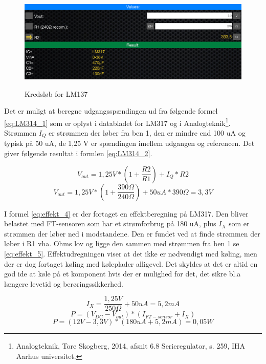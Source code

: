 \begin{figure}[H] \centering
{\includegraphics[width=\textwidth]{filer/design/Billeder/LM317_calc}}
\caption{Kredsløb for LM137}
\label{lab:LM317_calc}
\raggedright
\end{figure}

Det er muligt at beregne udgangsspændingen ud fra følgende formel \ref{eq:LM314_1} som er oplyst i databladet for LM317 og i Analogteknik\footnote{Analogteknik, Tore Skogberg, 2014, afsnit 6.8 Serieregulator, s. 259, IHA Aarhus universitet.}. Strømmen $I_Q$ er strømmen der løber fra ben 1, den er mindre end 100 uA og typisk på 50 uA, de 1,25 V er spændingen imellem udgangen og referencen. Det giver følgende resultat i formlen \ref{eq:LM314_2}. 

\begin{equation} 
V_{out} = 1,25 V*(1+\frac{R2}{R1})+I_Q*R2
\label{eq:LM314_1}
\end{equation}
\begin{equation} 
V_{out} = 1,25 V*(1+\frac{390\Omega}{240\Omega})+50uA*390\Omega = 3,3 V
\label{eq:LM314_2}
\end{equation}


I formel \ref{eq:effekt_4} er der fortaget en effektberegning på LM317. Den bliver belastet med FT-sensoren som har et strømforbrug på 180 uA, plus $I_X$ som er strømmen der løber ned i modstandene. Den er fundet ved at finde strømmen der løber i R1 vha. Ohms lov og ligge den sammen med strømmen fra ben 1 se \ref{eq:effekt_5}. Effektudregningen viser at det ikke er nødvendigt med køling, men der er dog  fortaget køling med køleplader alligevel. Det skyldes at det er altid en god ide at køle på et komponent hvis der er mulighed for det, det sikre bl.a længere levetid og berøringssikkerhed.

\begin{equation} 
I_X = \frac{1,25V}{250\Omega}+50uA = 5,2 mA  
\label{eq:effekt_5}
\end{equation} 
\begin{equation} 
P = (V_{DC}-V_{out})*(I_{FT-sensor}+I_X) 
\label{eq:effekt_3}
\end{equation}
\begin{equation} 
P = (12V - 3,3V)*(180 uA +5,2 mA)= 0,05 W 
\label{eq:effekt_4}
\end{equation}


